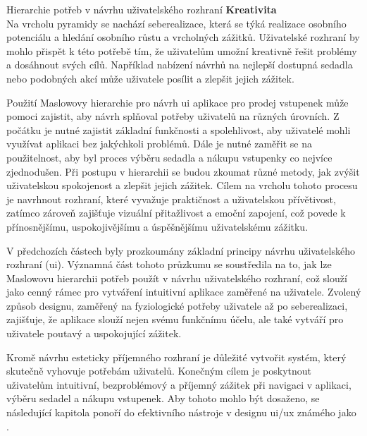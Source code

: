 \begin{subsection}{Hierarchie potřeb v návrhu uživatelského rozhraní}
    \textbf{Kreativita}\\
    Na vrcholu pyramidy se nachází seberealizace, která se týká realizace osobního potenciálu a hledání osobního růstu a vrcholných zážitků.
    Uživatelské rozhraní by mohlo přispět k této potřebě tím, že uživatelům umožní kreativně řešit problémy a dosáhnout svých cílů.
    Například nabízení návrhů na nejlepší dostupná sedadla nebo podobných akcí může uživatele posílit a zlepšit jejich zážitek.

    Použití Maslowovy hierarchie pro návrh \ac{ui} aplikace pro prodej vstupenek může pomoci zajistit, aby návrh splňoval potřeby uživatelů na různých úrovních.
    Z počátku je nutné zajistit základní funkčnosti a spolehlivost, aby uživatelé mohli využívat aplikaci bez jakýchkoli problémů.
    Dále je nutné zaměřit se na použitelnost, aby byl proces výběru sedadla a nákupu vstupenky co nejvíce zjednodušen.
    Při postupu v hierarchii se budou zkoumat různé metody, jak zvýšit uživatelskou spokojenost a zlepšit jejich zážitek.
    Cílem na vrcholu tohoto procesu je navrhnout rozhraní, které vyvažuje praktičnost a uživatelskou přívětivost, zatímco zároveň zajišťuje vizuální přitažlivost a emoční zapojení, což povede k přínosnějšímu, uspokojivějšímu a úspěšnějšímu uživatelskému zážitku.

    V předchozích částech byly prozkoumány základní principy návrhu uživatelského rozhraní (\ac{ui}).
    Významná část tohoto průzkumu se soustředila na to, jak lze Maslowovu hierarchii potřeb použít v návrhu uživatelského rozhraní, což slouží jako cenný rámec pro vytváření intuitivní aplikace zaměřené na uživatele.
    Zvolený způsob designu, zaměřený na fyziologické potřeby uživatele až po seberealizaci, zajišťuje, že aplikace slouží nejen svému funkčnímu účelu, ale také vytváří pro uživatele poutavý a uspokojující zážitek.

    Kromě návrhu esteticky příjemného rozhraní je důležité vytvořit systém, který skutečně vyhovuje potřebám uživatelů.
    Konečným cílem je poskytnout uživatelům intuitivní, bezproblémový a příjemný zážitek při navigaci v aplikaci, výběru sedadel a nákupu vstupenek.
    Aby tohoto mohlo být dosaženo, se následující kapitola ponoří do efektivního nástroje v designu \ac{ui}/\ac{ux} známého jako .
\end{subsection}
